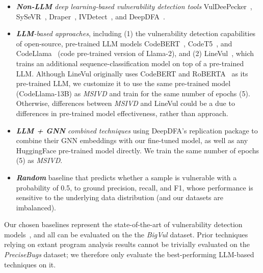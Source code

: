 \documentclass[12pt,openany,oneside,table]{cmuthesis}
\begin{document}
\begin{itemize}[leftmargin=5mm]
\item\emph{\textbf{Non-LLM} deep learning-based vulnerability detection tools}
VulDeePecker~\cite{vuldeepecker}, SySeVR~\cite{codet5}, Draper~\cite{draper}, IVDetect~\cite{ivdetect}, and DeepDFA~\cite{deepdfa}.
\item\emph{\textbf{LLM}-based approaches}, including (1) the vulnerability detection capabilities of open-source, pre-trained LLM models CodeBERT~\cite{codebert}, CodeT5~\cite{codet5}, and CodeLlama~\cite{codellama} (code pre-trained version of Llama-2), and (2) LineVul~\cite{linevul}, which trains an additional sequence-classification model on top of a pre-trained LLM. Although LineVul originally uses CodeBERT and RoBERTA~\cite{roberta} as its pre-trained LLM, we customize it to use the same pre-trained model (CodeLlama-13B) as \textit{MSIVD} and train for the same number of epochs (5). Otherwise, differences between \textit{MSIVD} and LineVul could be a due to differences in pre-trained model effectiveness, rather than approach.
\item\emph{\textbf{LLM + GNN} combined techniques} using DeepDFA's   replication package to combine their GNN embeddings with our fine-tuned model, as well as any HuggingFace pre-trained model directly. We train the same number of epochs (5) as \textit{MSIVD}.
\item\emph{\textbf{Random}} baseline that predicts whether a sample is vulnerable with a probability of 0.5, to ground precision, recall, and F1, whose performance is sensitive to the underlying data distribution (and our datasets are imbalanced).  
\end{itemize}

Our chosen baselines represent the state-of-the-art of vulnerability detection
models~\cite{deepdfa}, and all can be evaluated on the the \textit{BigVul} dataset.
Prior techniques relying on extant program analysis results cannot be trivially evaluated on the \textit{PreciseBugs} dataset; we therefore only evaluate the best-performing LLM-based techniques on it. 
\end{document}
